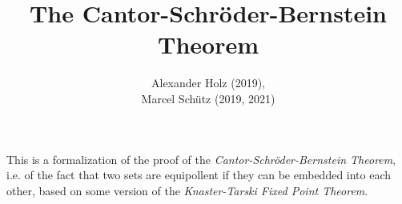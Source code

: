 \documentclass{article}
\title{The Cantor-Schröder-Bernstein Theorem}
\author{Alexander Holz (2019),\\
Marcel Schütz (2019, 2021)}
\date{}
\begin{document}

  \maketitle

  This is a formalization of the proof of the \textit{Cantor-Schröder-Bernstein
  Theorem}, i.e. of the fact that two sets are equipollent if they can be
  embedded into each other, based on some version of the \textit{Knaster-Tarski
  Fixed Point Theorem}.

\end{document}
